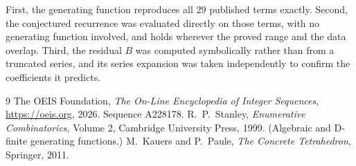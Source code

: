 \documentclass[11pt,a4paper]{article}
\theoremstyle{plain}
\theoremstyle{definition}
\begin{document}
First, the generating function reproduces all $29$ published terms exactly. Second,
the conjectured recurrence was evaluated directly on those terms, with no generating function
involved, and holds wherever the proved range and the data overlap. Third, the residual $B$ was
computed symbolically rather than from a truncated series, and its series expansion was taken
independently to confirm the coefficients it predicts.

\begin{thebibliography}{9}
 The OEIS Foundation, \emph{The On-Line Encyclopedia of Integer Sequences},
\url{https://oeis.org}, 2026. Sequence A228178.
 R.~P.~Stanley, \emph{Enumerative Combinatorics}, Volume 2, Cambridge
University Press, 1999. (Algebraic and D-finite generating functions.)
 M.~Kauers and P.~Paule, \emph{The Concrete Tetrahedron}, Springer, 2011.
\end{thebibliography}
\end{document}
